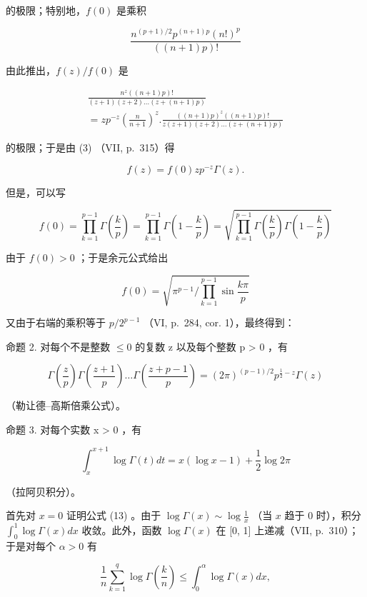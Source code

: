 的极限；特别地，\(f(0)\) 是乘积

\[
\frac {n ^ {(p + 1) / 2} p ^ {(n + 1) p} (n !) ^ {p}}{((n + 1) p) !}
\]

由此推出，\(f(z) / f(0)\) 是

\[
\begin{array}{c} \frac {n ^ {z} ((n + 1) p) !}{(z + 1) (z + 2) \dots (z + (n + 1) p)} \\ = z   p ^ {- z} \left(\frac {n}{n + 1}\right) ^ {z}. \frac {((n + 1) p) ^ {z} ((n + 1) p) !}{z (z + 1) (z + 2) \dots (z + (n + 1) p)} \end{array}
\]

的极限；于是由 (3) （VII, p.~315）得

\[
f (z) = f (0) z p ^ {- z} \Gamma (z).\tag{11}
\]

但是，可以写

\[
f (0) = \prod_ {k = 1} ^ {p - 1} \Gamma \left(\frac {k}{p}\right) = \prod_ {k = 1} ^ {p - 1} \Gamma \left(1 - \frac {k}{p}\right) = \sqrt {\prod_ {k = 1} ^ {p - 1} \Gamma \left(\frac {k}{p}\right) \Gamma \left(1 - \frac {k}{p}\right)}
\]

由于 \(f(0) > 0\) ；于是余元公式给出

\[
f (0) = \sqrt {\pi^ {p - 1} / \prod_ {k = 1} ^ {p - 1} \sin \frac {k \pi}{p}}
\]

又由于右端的乘积等于 \(p/2^{p-1}\) （VI, p.~284, cor. 1），最终得到：

命题 2. 对每个不是整数 \(\leqslant 0\) 的复数 z 以及每个整数 p \textgreater{} 0 ，有

\[
\Gamma \left(\frac {z}{p}\right) \Gamma \left(\frac {z + 1}{p}\right) \dots \Gamma \left(\frac {z + p - 1}{p}\right) = (2 \pi) ^ {(p - 1) / 2} p ^ {\frac {1}{2} - z} \Gamma (z)\tag{12}
\]

（勒让德–高斯倍乘公式）。

命题 3. 对每个实数 x \textgreater{} 0 ，有

\[
\int_ {x} ^ {x + 1} \log \Gamma (t) d t = x (\log x - 1) + \frac {1}{2} \log 2 \pi\tag{13}
\]

（拉阿贝积分）。

首先对 \(x = 0\) 证明公式 (13) 。由于 \(\log \Gamma(x) \sim \log \frac{1}{x}\) （当 \(x\) 趋于 0 时），积分 \(\int_0^1 \log \Gamma(x) dx\) 收敛。此外，函数 \(\log \Gamma(x)\) 在 {[}0, 1{]} 上递减（VII, p.~310）；于是对每个 \(\alpha > 0\) 有

\[
\frac {1}{n} \sum_ {k = 1} ^ {q} \log \Gamma \left(\frac {k}{n}\right) \leqslant \int_ {0} ^ {\alpha} \log \Gamma (x) d x,
\]

